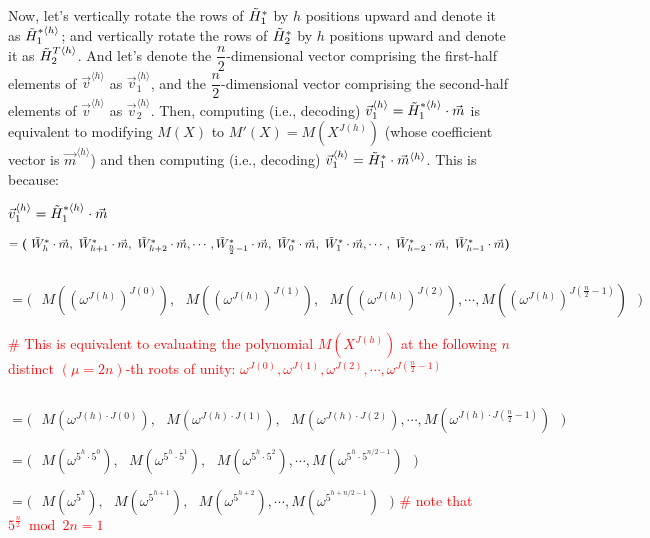 Now, let's vertically rotate the rows of $\tilde{H}_1^*$ by $h$ positions upward and denote it as $\tilde{ H}_1^{*\langle h \rangle}$; and vertically rotate the rows of $\tilde{H}_2^*$ by $h$ positions upward and denote it as $\tilde{H}_2^{T\langle h \rangle}$. And let's denote the $\dfrac{n}{2}$-dimensional vector comprising the first-half elements of $\vec{v}^{\langle h \rangle}$ as $\vec{v}_1^{\langle h \rangle}$, and the $\dfrac{n}{2}$-dimensional vector comprising the second-half elements of $\vec{v}^{\langle h \rangle}$ as $\vec{v}_2^{\langle h \rangle}$. 
Then, computing (i.e., decoding) $\vec{v}_1^{\langle h \rangle} = \tilde{H}_1^{*\langle h \rangle}\cdot \vec{m}$ is equivalent to modifying $M(X)$ to $M'(X) = M(X^{J(h)})$ (whose coefficient vector is $\vec{m}^{\langle h \rangle}$) and then computing (i.e., decoding) $\vec{v}_1^{\langle h \rangle} = \tilde{H}_1^{*}\cdot \vec{m}^{\langle h \rangle}$. This is because:

$\vec{v}_1^{\langle h \rangle} =\tilde{H}_1^{*\langle h \rangle}\cdot \vec{m}$

$ = \bm{(} \text{ } \tilde{W}^*_{h}\cdot\vec{m}, \text{ } \tilde{W}^*_{h+1}\cdot\vec{m}, \text{ } \tilde{W}^*_{h+2}\cdot\vec{m}, \cdots, \tilde{W}^*_{\frac{n}{2}-1}\cdot\vec{m}, \text{ } \tilde{W}^*_{0}\cdot\vec{m}, \text{ }\tilde{W}^*_{1}\cdot\vec{m}, \cdots, \text{ } \tilde{W}^*_{h-2}\cdot\vec{m}, \text{ } \tilde{W}^*_{h-1}\cdot\vec{m}  \bm{)}$

$ $

$= \bm{(} \text{ } M((\omega^{J(h)})^{J(0)}), \text{ } M((\omega^{J(h)})^{J(1)}), \text{ } M((\omega^{J(h)})^{J(2)}), \cdots, M((\omega^{J(h)})^{J(\frac{n}{2}-1)}) \text{ } \bm{)}$


\textcolor{red}{\# This is equivalent to evaluating the polynomial $M(X^{J(h)})$ at the following $n$ distinct $(\mu=2n)$-th roots of unity: $\omega^{J(0)}, \omega^{J(1)},  \omega^{J(2)}, \cdots, \omega^{J(\frac{n}{2} - 1)}$}

$ $

$= \bm{(} \text{ } M(\omega^{J(h)\cdot J(0)}), \text{ } M(\omega^{J(h)\cdot J(1)}), \text{ } M(\omega^{J(h)\cdot J(2)}), \cdots, M(\omega^{J(h)\cdot J(\frac{n}{2}-1)}) \text{ } \bm{)}$

$= \bm{(} \text{ } M(\omega^{5^h\cdot 5^0}), \text{ } M(\omega^{5^h\cdot 5^1}), \text{ } M(\omega^{5^h\cdot 5^2}), \cdots, M(\omega^{5^h\cdot 5^{n/2-1}}) \text{ } \bm{)}$

$= \bm{(} \text{ } M(\omega^{5^{h}}), \text{ } M(\omega^{5^{h+1}}), \text{ } M(\omega^{5^{h+2}}), \cdots, M(\omega^{5^{h+n/2-1}}) \text{ } \bm{)}$ \textcolor{red}{ \# note that $5^{\frac{n}{2}} \bmod 2n = 1$}


